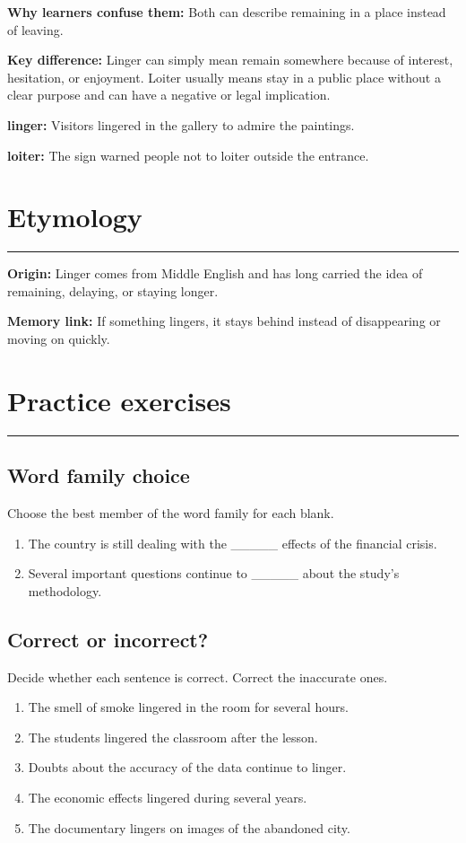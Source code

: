 \documentclass[11pt]{article}
\newcommand{\sectionrule}{\par\vspace{-0.5em}\noindent\textcolor{Accent}{\rule{\linewidth}{0.6pt}}\par}
\begin{document}
\textbf{Why learners confuse them:} Both can describe remaining in a place instead of leaving.

\textbf{Key difference:} Linger can simply mean remain somewhere because of interest, hesitation, or enjoyment. Loiter usually means stay in a public place without a clear purpose and can have a negative or legal implication.

\textbf{linger:} Visitors lingered in the gallery to admire the paintings.

\textbf{loiter:} The sign warned people not to loiter outside the entrance.

\section{Etymology}
\sectionrule
\textbf{Origin:} Linger comes from Middle English and has long carried the idea of remaining, delaying, or staying longer.

\textbf{Memory link:} If something lingers, it stays behind instead of disappearing or moving on quickly.

\section{Practice exercises}
\sectionrule
\subsection{Word family choice}
Choose the best member of the word family for each blank.

\begin{enumerate}
  \item The country is still dealing with the \_\_\_\_\_ effects of the financial crisis.
  \item Several important questions continue to \_\_\_\_\_ about the study's methodology.
\end{enumerate}

\subsection{Correct or incorrect?}
Decide whether each sentence is correct. Correct the inaccurate ones.

\begin{enumerate}
  \item The smell of smoke lingered in the room for several hours.
  \item The students lingered the classroom after the lesson.
  \item Doubts about the accuracy of the data continue to linger.
  \item The economic effects lingered during several years.
  \item The documentary lingers on images of the abandoned city.
\end{enumerate}
\end{document}
